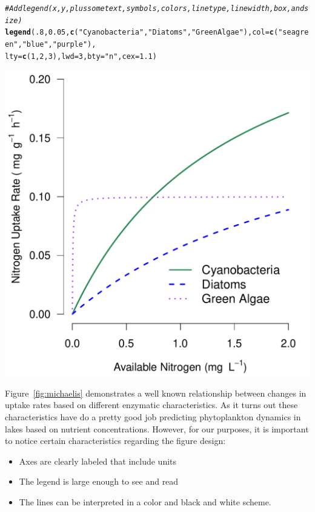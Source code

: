 \documentclass{tufte-handout}\usepackage[]{graphicx}\usepackage[]{xcolor}
\makeatletter
\def\maxwidth{ %
  \ifdim\Gin@nat@width>\linewidth
    \linewidth
  \else
    \Gin@nat@width
  \fi
}
\newcommand{\hlnum}[1]{\textcolor[rgb]{0.686,0.059,0.569}{#1}}%
\newcommand{\hlstr}[1]{\textcolor[rgb]{0.192,0.494,0.8}{#1}}%
\newcommand{\hlcom}[1]{\textcolor[rgb]{0.678,0.584,0.686}{\textit{#1}}}%
\newcommand{\hlstd}[1]{\textcolor[rgb]{0.345,0.345,0.345}{#1}}%
\newcommand{\hlkwc}[1]{\textcolor[rgb]{0.333,0.667,0.333}{#1}}%
\newcommand{\hlkwd}[1]{\textcolor[rgb]{0.737,0.353,0.396}{\textbf{#1}}}%
\newenvironment{kframe}{%
 \def\at@end@of@kframe{}%
 \ifinner\ifhmode%
  \def\at@end@of@kframe{\end{minipage}}%
  \begin{minipage}{\columnwidth}%
 \fi\fi%
 \def\FrameCommand##1{\hskip\@totalleftmargin \hskip-\fboxsep
 \colorbox{shadecolor}{##1}\hskip-\fboxsep
     \hskip-\linewidth \hskip-\@totalleftmargin \hskip\columnwidth}%
 \MakeFramed {\advance\hsize-\width
   \@totalleftmargin\z@ \linewidth\hsize
   \@setminipage}}%
 {\par\unskip\endMakeFramed%
 \at@end@of@kframe}
\newenvironment{knitrout}{}{} %
\makeatother
\begin{document}
\begin{knitrout}
\begin{kframe}
\begin{alltt}
\hlcom{# Add legend(x, y, plus some text, symbols, colors, line type, line width, box, and size)}
\hlkwd{legend}\hlstd{(}\hlnum{.8}\hlstd{,} \hlnum{0.05}\hlstd{,} \hlkwd{c}\hlstd{(}\hlstr{"Cyanobacteria"}\hlstd{,} \hlstr{"Diatoms"}\hlstd{,} \hlstr{"Green Algae"}\hlstd{),} \hlkwc{col}\hlstd{=}\hlkwd{c}\hlstd{(}\hlstr{"seagreen"}\hlstd{,} \hlstr{"blue"}\hlstd{,} \hlstr{"purple"}\hlstd{),}
\hlkwc{lty}\hlstd{=}\hlkwd{c}\hlstd{(}\hlnum{1}\hlstd{,}\hlnum{2}\hlstd{,}\hlnum{3}\hlstd{),} \hlkwc{lwd}\hlstd{=}\hlnum{3}\hlstd{,} \hlkwc{bty}\hlstd{=}\hlstr{"n"}\hlstd{,} \hlkwc{cex}\hlstd{=}\hlnum{1.1}\hlstd{)}
\end{alltt}
\end{kframe}
\includegraphics[width=\maxwidth]{figure/a-1} 
\end{knitrout}

Figure~\ref{fig:michaelis} demonstrates a well known relationship between changes in uptake rates based on different enzymatic characteristics. As it turns out these characteristics have do a pretty good job predicting phytoplankton dynamics in lakes based on nutrient concentrations. However, for our purposes, it is important to notice certain characteristics regarding the figure design:

\begin{itemize}
	\item Axes are clearly labeled that include units
	\item The legend is large enough to see and read
	\item The lines can be interpreted in a color and black and white scheme.
\end{itemize}
\end{document}
